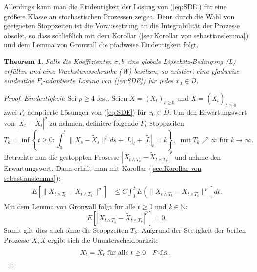 \documentclass[10pt, a4paper, leqno, twoside, bibliography=totocnumbered, final]{scrartcl}
\theoremstyle{definition}
\theoremstyle{plain}%
\newtheorem{thm}[defin]{Theorem}
\theoremstyle{remark}
\begin{document}
Allerdings kann man die Eindeutigkeit der Lösung von (\ref{eq:SDE}) für eine größere Klasse an stochastischen Prozessen zeigen. Denn durch die Wahl von geeigneten Stoppzeiten ist die Voraussetzung an die Integrabilität der Prozesse obsolet, so dass schließlich mit dem Korollar (\ref{sec:Korollar von sebastianslemma}) und dem Lemma von Gronwall die pfadweise Eindeutigkeit folgt.
\begin{thm}
Falls die Koeffizienten $ \sigma , b $ eine globale Lipschitz-Bedingung (L) erfüllen und eine Wachstumsschranke (W) besitzen, so existiert eine pfadweise eindeutige $ F_{t} $-adaptierte Lösung von (\ref{eq:SDE}) für jedes $ x_{0} \in \overline{D} $.
\end{thm}


\begin{proof}
\emph{Eindeutigkeit:} Sei $ p \geq 4 $ fest. Seien $ X =(X_{t})_{t \geq 0} $ und $ \tilde{X} = (\tilde{X_{t}})_{t \geq 0} $ zwei $ F_t $-adaptierte Lösungen von (\ref{eq:SDE}) für $ x_0 \in \overline{D} $. Um den Erwartungswert von $ | X_t - \tilde{X}_t |^{p} $ zu nehmen, definiere folgende $ F_t $-Stoppzeiten
\begin{equation*}
T_k = \inf \left\lbrace t \geq 0 : \int_0^t \| X_s - \tilde{X}_s \|^{p} ds + |L|_t + |\tilde{L}|_t = k  \right\rbrace , \; \text{ mit } T_k \nearrow \infty \text{ für } k \to \infty.
\end{equation*}
Betrachte nun die gestoppten Prozesse $ | X_{t \wedge T_k} - \tilde{X}_{t \wedge T_k} |^{p} $ und nehme den Erwartungswert. Dann erhält man mit  Korollar (\ref{sec:Korollar von sebastianslemma}):
\begin{align}
\label{eq:Thm-Stoppzeiten}
\begin{split}
E[ \| X_{t \wedge T_k} - \tilde{X}_{t \wedge T_k} \|^{p} ] & \leq C \int_0^T E \left(  \|  X_{t \wedge T_k} - \tilde{X}_{t \wedge T_k} \|^{p}  \right] dt.
\end{split}
\end{align}
Mit dem Lemma von Gronwall folgt für alle $ t \geq 0 $ und $ k \in \mathbb{N} $:
\begin{equation*}
E[ | X_{t \wedge T_k} - \tilde{X}_{t \wedge T_k} |^{p} ] = 0.
\end{equation*}
Somit gilt dies auch ohne die Stoppzeiten $ T_k $. Aufgrund der Stetigkeit der beiden Prozesse $ X, \tilde{X} $ ergibt sich die Ununterscheidbarkeit:
\begin{equation*}
X_t = \tilde{X}_t \text{ für alle $ t \geq 0  \quad P $-f.s.. }
\end{equation*}


\end{proof}
\end{document}
